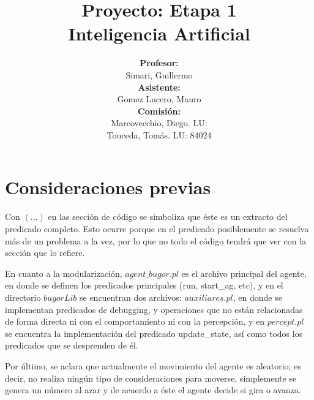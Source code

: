 \documentclass[a4paper,10pt,spanish]{article}
\begin{document}
\begin{titlepage}

\title{{\bf Proyecto: Etapa 1}\\ Inteligencia Artificial\vspace{10mm}}
\author{{\bf Profesor:}\\ Simari, Guillermo\\
{\bf Asistente:}\\ Gomez Lucero, Mauro\\
{\bf Comisi\'on:}\\ Marcovecchio, Diego. LU: \\ Touceda, Tom\'as. LU: 84024}
\date{}

\maketitle

\thispagestyle{empty}

\end{titlepage}

\newpage

\tableofcontents

\newpage

\section{Consideraciones previas}

	Con $(...)$ en las secci\'on de c\'odigo se simboliza que \'este es un extracto del predicado completo. Esto ocurre porque en el predicado posiblemente se resuelva m\'as de un problema a la vez, por lo que no todo el c\'odigo tendr\'a que ver con la secci\'on que lo refiere.
	
	En cuanto a la modularizaci\'on, $agent\_bugor.pl$ es el archivo principal del agente, en donde se definen los predicados principales (run, start\_ag, etc), y en el directorio $bugorLib$ se encuentran dos archivos: $auxiliares.pl$, en donde se implementan predicados de debugging, y operaciones que no est\'an relacionadas de forma directa ni con el comportamiento ni con la percepci\'on, y en $percept.pl$ se encuentra la implementaci\'on del predicado update\_state, as\'i como todos los predicados que se desprenden de \'el.

	Por \'ultimo, se aclara que actualmente el movimiento del agente es aleatorio; es decir, no realiza ning\'un tipo de consideraciones para moverse, simplemente se genera un n\'umero al azar y de acuerdo a \'este el agente decide si gira o avanza.
\end{document}
